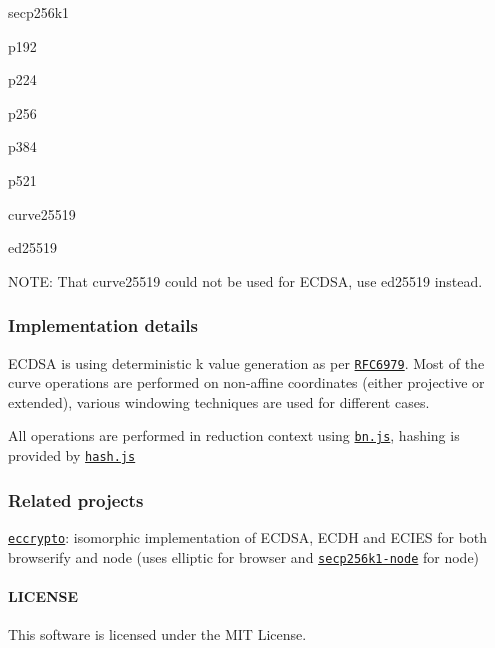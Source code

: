 \begin{DoxyItemize}
\item {\ttfamily secp256k1}
\item {\ttfamily p192}
\item {\ttfamily p224}
\item {\ttfamily p256}
\item {\ttfamily p384}
\item {\ttfamily p521}
\item {\ttfamily curve25519}
\item {\ttfamily ed25519}
\end{DoxyItemize}

N\+O\+TE\+: That {\ttfamily curve25519} could not be used for E\+C\+D\+SA, use {\ttfamily ed25519} instead.

\subsubsection*{Implementation details}

E\+C\+D\+SA is using deterministic {\ttfamily k} value generation as per \href{http://tools.ietf.org/html/rfc6979}{\tt R\+F\+C6979}. Most of the curve operations are performed on non-\/affine coordinates (either projective or extended), various windowing techniques are used for different cases.

All operations are performed in reduction context using \href{https://github.com/indutny/bn.js}{\tt bn.\+js}, hashing is provided by \href{https://github.com/indutny/hash.js}{\tt hash.\+js}

\subsubsection*{Related projects}


\begin{DoxyItemize}
\item \href{https://github.com/bitchan/eccrypto}{\tt eccrypto}\+: isomorphic implementation of E\+C\+D\+SA, E\+C\+DH and E\+C\+I\+ES for both browserify and node (uses {\ttfamily elliptic} for browser and \href{https://github.com/wanderer/secp256k1-node}{\tt secp256k1-\/node} for node)
\end{DoxyItemize}

\paragraph*{L\+I\+C\+E\+N\+SE}

This software is licensed under the M\+IT License.

